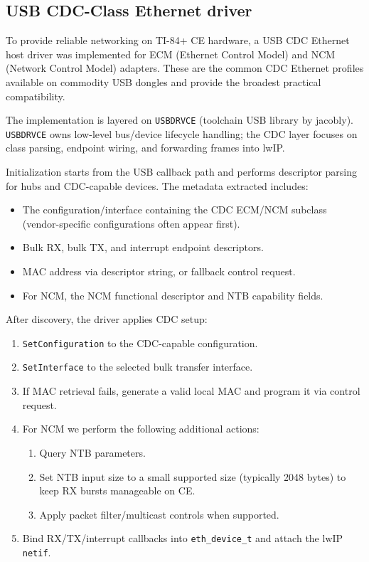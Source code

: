 \documentclass[titlepage]{report}
\begin{document}
		
		\subsection{USB CDC-Class Ethernet driver}
		To provide reliable networking on TI-84+ CE hardware, a USB CDC Ethernet host driver was implemented for ECM (Ethernet Control Model) and NCM (Network Control Model) adapters. These are the common CDC Ethernet profiles available on commodity USB dongles and provide the broadest practical compatibility.

		The implementation is layered on \texttt{USBDRVCE} (toolchain USB library by jacobly). \texttt{USBDRVCE} owns low-level bus/device lifecycle handling; the CDC layer focuses on class parsing, endpoint wiring, and forwarding frames into lwIP.

		Initialization starts from the USB callback path and performs descriptor parsing for hubs and CDC-capable devices. The metadata extracted includes:
		\begin{itemize}
			\item The configuration/interface containing the CDC ECM/NCM subclass (vendor-specific configurations often appear first).
			\item Bulk RX, bulk TX, and interrupt endpoint descriptors.
			\item MAC address via descriptor string, or fallback control request.
			\item For NCM, the NCM functional descriptor and NTB capability fields.
		\end{itemize}

		After discovery, the driver applies CDC setup:
		\begin{enumerate}
			\item \texttt{SetConfiguration} to the CDC-capable configuration.
			\item \texttt{SetInterface} to the selected bulk transfer interface.
			\item If MAC retrieval fails, generate a valid local MAC and program it via control request.
			\item For NCM we perform the following additional actions:
				\begin{enumerate}
					\item Query NTB parameters.
					\item Set NTB input size to a small supported size (typically 2048 bytes) to keep RX bursts manageable on CE.
					\item Apply packet filter/multicast controls when supported.
				\end{enumerate}
			\item Bind RX/TX/interrupt callbacks into \texttt{eth\_device\_t} and attach the lwIP \texttt{netif}.
		\end{enumerate}
\end{document}
